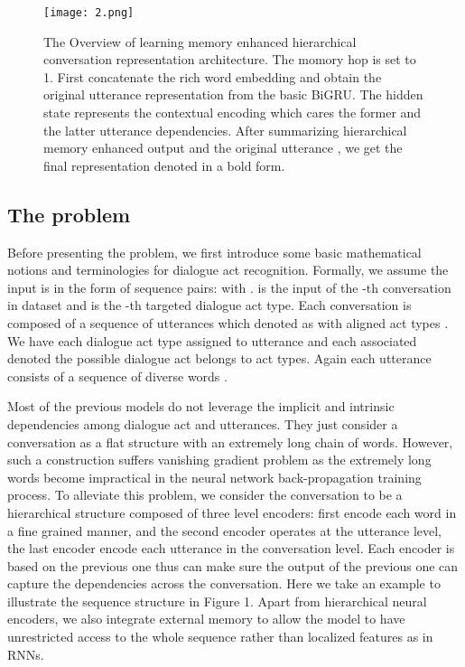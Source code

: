 \documentclass[sigconf]{acmart}
\begin{document}
\begin{figure*}[t]
	\centering
	\texttt{[image: 2.png]}
	\caption{The Overview of learning memory enhanced hierarchical conversation representation architecture. The momory hop is set to 1. First concatenate the rich word embedding and obtain the original utterance representation  from the basic BiGRU. The hidden state  represents the contextual encoding which cares the former and the latter utterance dependencies. After summarizing hierarchical memory enhanced output  and the original utterance , we get the final representation  denoted in a bold form.}
\end{figure*}

\subsection{The problem}
Before presenting the problem, we first introduce some basic mathematical notions and terminologies for dialogue act recognition. Formally, we assume the input is in the form of sequence pairs:  with .  is the input of the -th conversation in dataset  and  is the -th targeted dialogue act type. Each conversation  is composed of a sequence of utterances which denoted as  with aligned act types . We have each dialogue act type assigned to utterance  and each associated  denoted the possible dialogue act belongs to  act types. Again each utterance consists of a sequence of diverse words .

Most of the previous models do not leverage the implicit and intrinsic dependencies among dialogue act and utterances. They just consider a conversation as a flat structure with an extremely long chain of words. However, such a construction suffers vanishing gradient problem as the extremely long words become impractical in the neural network back-propagation training process. To alleviate this problem, we consider the conversation to be a hierarchical structure composed of three level encoders: first encode each word in a fine grained manner, and the second encoder operates at the utterance level, the last encoder encode each utterance in the conversation level. Each encoder is based on the previous one thus can make sure the output of the previous one can capture the dependencies across the conversation. Here we take an example to illustrate the sequence structure in Figure 1. Apart from hierarchical neural encoders, we also integrate external memory to allow the model to have unrestricted access to the whole sequence rather than localized features as in RNNs.
\end{document}
